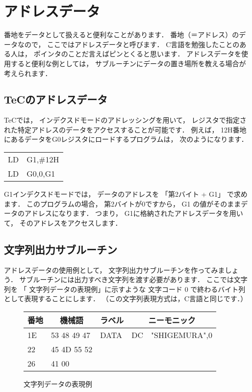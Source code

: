 \newpage
\section{アドレスデータ}

番地をデータとして扱えると便利なことがあります．
番地（＝アドレス）のデータなので，
ここではアドレスデータと呼びます．
C言語を勉強したことのある人は，
ポインタのことだ言えばピンとくると思います．
アドレスデータを使用すると便利な例としては，
サブルーチンにデータの置き場所を教える場合が考えられます．

\subsection{TeCのアドレスデータ}

TeCでは，
インデクスドモードのアドレッシングを用いて，
レジスタで指定された特定アドレスのデータをアクセスすることが可能です．
例えば，
12H番地にあるデータをG0レジスタにロードするプログラムは，
次のようになります．

{\tt\small\begin{center}
\begin{tabular}{l l}
LD & G1,\#12H       \\
LD & G0,0,G1 \\
\end{tabular}
\end{center}}

G1インデクスドモードでは，
データのアドレスを 「第2バイト + G1」 で求めます．
このプログラムの場合，
第2バイトが0ですから，
G1 の値がそのままデータのアドレスになります．
つまり，
G1に格納されたアドレスデータを用いて，
そのアドレスをアクセスします．

\subsection{文字列出力サブルーチン}
アドレスデータの使用例として，
文字列出力サブルーチンを作ってみましょう．
サブルーチンには出力すべき文字列を渡す必要があります．
ここでは文字列を
「 文字列データの表現例」に示すような
文字コード 0 で終わるバイト列として表現することにします．
（この文字列表現方式は，C言語と同じです．）

\begin{figure}[btp]
{\small\tt\begin{center}
\begin{tabular}{|l|l|l|l l|} \hline
番地 & \multicolumn{1}{|c|}{機械語}
     & ラベル & \multicolumn{2}{|c|}{ニーモニック} \\
\hline
1E & 53 48 49 47 & DATA  & DC   & "SHIGEMURA",0   \\
22 & 45 4D 55 52 &       &      &                 \\
26 & 41 00       &       &      &                 \\
\hline
\end{tabular}
\end{center}}
\caption{文字列データの表現例}
\label{fig:chap6:str}
\end{figure}

